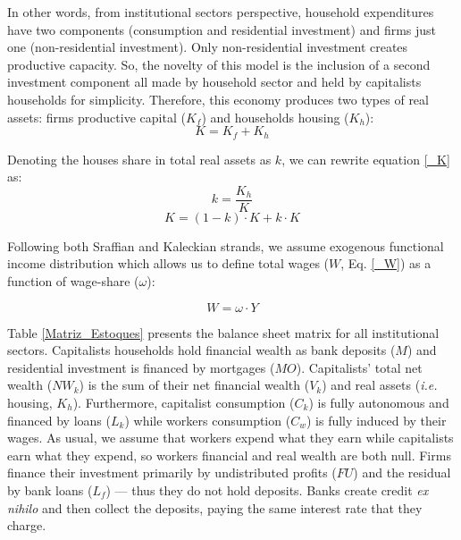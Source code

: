 \documentclass[11pt]{article}
\begin{document}
In other words, from institutional sectors perspective, household expenditures have two components (consumption and residential investment) and firms just one (non-residential investment). 
Only non-residential investment creates productive capacity. 
So, the novelty of this model is the inclusion of a second investment component all made by household sector and held by capitalists households for simplicity. 
Therefore, this economy produces two types of real assets: firms productive capital (\(K_f\)) and households housing (\(K_h\)):
\begin{equation}
    \label{_K}
    K = K_f + K_h
\end{equation}

Denoting the houses share in total real assets as \(k\), we can rewrite equation \ref{_K} as:
\begin{equation}
\label{_k}
    k = \frac{K_h}{K}
\end{equation}
$$
K = (1-k)\cdot K + k\cdot K
$$

Following both Sraffian and Kaleckian strands, we assume exogenous functional income distribution which allows us to define total wages (\(W\), Eq. \ref{_W}) as a function of wage-share (\(\omega\)):

\begin{equation}
\label{_W}
    W = \omega\cdot Y
\end{equation}

Table \ref{Matriz_Estoques} presents the balance sheet matrix for all institutional sectors. 
Capitalists households hold financial wealth as bank deposits (\(M\)) and residential investment is financed by mortgages (\(MO\)).
Capitalists' total net wealth (\(NW_{k}\)) is the sum of their net financial wealth (\(V_{k}\)) and real assets (\textit{i.e.} housing, \(K_h\)). 
Furthermore, capitalist consumption (\(C_k\)) is fully autonomous and financed by loans (\(L_{k}\)) while workers consumption (\(C_w\)) is fully induced by their wages.
As usual, we assume that workers expend what they earn while capitalists earn what they expend, so workers financial and real wealth are both null.
Firms finance their investment primarily by undistributed profits (\(FU\)) and the residual by bank loans (\(L_f\)) --- thus they do not hold deposits. 
Banks create credit \textit{ex nihilo} and then collect the deposits, paying the same interest rate that they charge.
\end{document}
